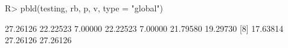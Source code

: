 \begin{Schunk}
% --begin: "pbld6"
\begin{Sinput}
R> pbld(testing, rb, p, v, type = "global")
\end{Sinput}
\begin{Soutput}
 [1] 27.26126 22.22523  7.00000 22.22523  7.00000 21.79580 19.29730
 [8] 17.63814 27.26126 27.26126
\end{Soutput}
%
% --end: "pbld6"
\end{Schunk}

